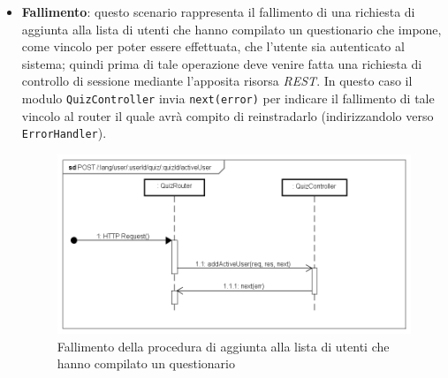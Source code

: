 \begin{itemize}
\item \textbf{Fallimento}: questo scenario rappresenta il fallimento di una richiesta di aggiunta alla lista di utenti che hanno compilato un questionario che impone, come vincolo per poter essere effettuata, che l'utente sia autenticato al sistema; quindi prima di tale operazione deve venire fatta una richiesta di controllo di sessione mediante l'apposita risorsa \textit{REST}. In questo caso il modulo \texttt{QuizController} invia \texttt{next(error)} per indicare il fallimento di tale vincolo al router il quale avrà compito di reinstradarlo (indirizzandolo verso \texttt{ErrorHandler}).
\label{Fallimento della procedura di aggiunta alla lista di utenti che hanno compilato un questionario}
\begin{figure}[ht]
	\centering
	\includegraphics[scale=0.40]{UML/DiagrammiDiSequenza/Back-end/POST__lang_user_userId_quiz_quizId_activeUser_failure.png}
	\caption{Fallimento della procedura di aggiunta alla lista di utenti che hanno compilato un questionario}
\end{figure}
\FloatBarrier
\end{itemize}

